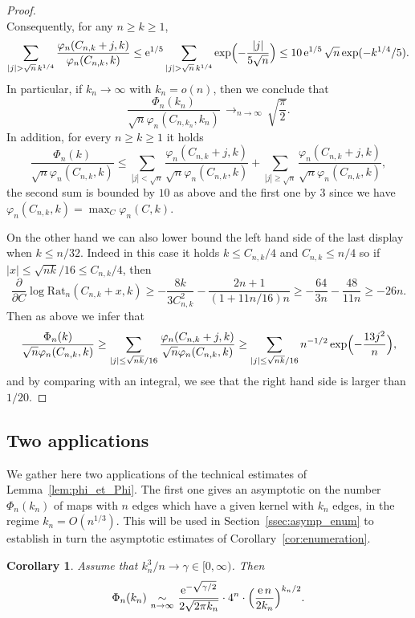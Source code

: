 \documentclass[JEP,XML,SOM,Unicode,NoFloatCountersInSection,NoEqCountersInSection]{cedram}
\theoremstyle{plain}
\newtheorem{corollary}[theorem]{Corollary}
\theoremstyle{definition}
\theoremstyle{remark}
\newcommand{\e}{\operatorname{e}}
\newcommand{\cv}[1][n]{\,\mathop{\longrightarrow}^{}_{#1 \to \infty}\,}
\begin{document}
\begin{proof}
\[\]
Consequently, for any $n\ge k \ge 1$,
\[
\sum_{|j| > \sqrt{n}\,k^{1/4}} \frac{\varphi_{n}(C_{n,k}+j,k)}{\varphi_{n}(C_{n,k},k)}
\leq \e^{1/5} \sum_{|j| > \sqrt{n}\,k^{1/4}} \exp\Bigl(- \frac{|j|}{5\sqrt{n}}\Bigr)
\leq 10 \e^{1/5} \sqrt{n} \exp(- k^{1/4}/5).
\]
In particular, if $k_n \to\infty$ with $k_n = o(n)$, then we conclude that
\[
\frac{\Phi_n(k_n)}{\sqrt{n} \varphi_{n}(C_{n,k_n},k_n)} \cv \sqrt{\frac{\pi}{2}}.
\]
In addition, for every $n \ge k \ge 1$ it holds
\[
\frac{\Phi_n(k)}{\sqrt{n} \varphi_{n}(C_{n,k},k)}
\le \sum_{|j| < \sqrt{n}} \frac{\varphi_{n}(C_{n,k}+j,k)}{\sqrt{n} \varphi_{n}(C_{n,k},k)} + \sum_{|j| \ge \sqrt{n}} \frac{\varphi_{n}(C_{n,k}+j,k)}{\sqrt{n} \varphi_{n}(C_{n,k},k)},
\]
the second sum is bounded by $10$ as above and the first one by $3$ since we have $\varphi_{n}(C_{n,k},k) = \max_C \varphi_{n}(C,k)$.

On the other hand we can also lower bound the left hand side of the last display when $k \le n/32$. Indeed in this case it holds $k \le C_{n,k}/4$ and $C_{n,k} \le n/4$ so if $|x| \le \sqrt{nk}/16 \le C_{n,k}/4$, then\vspace*{-3pt}
\[
\frac{\partial}{\partial C} \log \mathrm{Rat}_n(C_{n,k}+x,k)
\ge - \frac{8k}{3 C_{n,k}^2} - \frac{2n+1}{(1+11n/16) n}
\ge - \frac{64}{3 n} - \frac{48}{11n}
\ge -26n.
\]
Then as above we infer that
\[
\frac{\Phi_n(k)}{\sqrt{n} \varphi_{n}(C_{n,k},k)}
\ge \sum_{|j| \leq \sqrt{nk}/16} \frac{\varphi_{n}(C_{n,k}+j,k)}{\sqrt{n} \varphi_{n}(C_{n,k},k)}
\ge \sum_{|j| \leq \sqrt{nk}/16} n^{-1/2} \exp\Bigl(-\frac{13 j^2}{n}\Bigr),
\]
and by comparing with an integral, we see that the right hand side is larger than \eg $1/20$.
\end{proof}

\subsection{Two applications}

We gather here two applications of the technical estimates of Lemma~\ref{lem:phi_et_Phi}. The first one gives an asymptotic on the number $\Phi_{n}(k_{n})$ of maps with $n$ edges which have a given kernel with $k_{n}$ edges, in the regime $k_n = O(n^{1/3})$. This will be used in Section~\ref{ssec:asymp_enum} to establish in turn the asymptotic estimates of Corollary~\ref{cor:enumeration}.

\begin{corollary}
\label{cor:equivPhikn}
Assume that $k_{n}^3/n \to \gamma \in [0,\infty)$. Then\vspace*{-3pt}
\[
\Phi_{n}(k_{n}) \, \mathop{\sim}_{n \rightarrow \infty} \,
\frac{\e^{- \sqrt{\gamma/2}}}{2\sqrt{2 \pi k_{n}}} \cdot 4^{n} \cdot \Bigl(\frac{\e n}{2 k_{n}}\Bigr)^{k_{n}/2}.
\]
\end{corollary}
\end{document}
